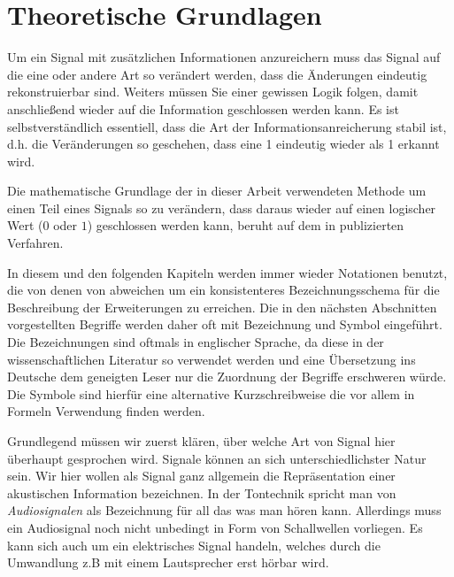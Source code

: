 \chapter{Theoretische Grundlagen}
\label{ch:theorie}

Um ein Signal mit zus\"atzlichen Informationen anzureichern muss das Signal auf die eine oder andere Art so ver\"andert werden, dass die Änderungen eindeutig rekonstruierbar sind. Weiters m\"ussen Sie einer gewissen Logik folgen, damit anschlie{\ss}end wieder auf die Information geschlossen werden kann. Es ist selbstverst\"andlich essentiell, dass die Art der Informationsanreicherung stabil ist, d.h. die Ver\"anderungen so geschehen, dass eine 1 eindeutig wieder als 1 erkannt wird.
	
Die mathematische Grundlage der in dieser Arbeit verwendeten Methode um einen Teil eines Signals so zu verändern, dass daraus wieder auf einen logischer Wert ($0$ oder $1$) geschlossen werden kann, beruht auf dem in \cite{xiang2007robust} publizierten Verfahren.

In diesem und den folgenden Kapiteln werden immer wieder Notationen benutzt, die von denen von \cite{xiang2007robust} abweichen um ein konsistenteres Bezeichnungsschema für die Beschreibung der Erweiterungen zu erreichen. Die in den nächsten Abschnitten vorgestellten Begriffe werden daher oft mit Bezeichnung und Symbol eingeführt. Die Bezeichnungen sind oftmals in englischer Sprache, da diese in der wissenschaftlichen Literatur so verwendet werden und eine Übersetzung ins Deutsche dem geneigten Leser nur die Zuordnung der Begriffe erschweren w\"urde. Die Symbole sind hierf\"ur eine alternative Kurzschreibweise die vor allem in Formeln Verwendung finden werden. 

Grundlegend müssen wir zuerst klären, über welche Art von Signal hier überhaupt gesprochen wird. Signale können an sich unterschiedlichster Natur sein. Wir hier wollen als Signal ganz allgemein die Repräsentation einer akustischen Information bezeichnen. In der Tontechnik spricht man von \textit{Audiosignalen} als Bezeichnung für all das \glqq{}was man hören kann\grqq{}. Allerdings muss ein Audiosignal noch nicht unbedingt in Form von Schallwellen vorliegen. Es kann sich auch um ein elektrisches Signal handeln, welches durch die Umwandlung z.B mit einem Lautsprecher erst hörbar wird. 

